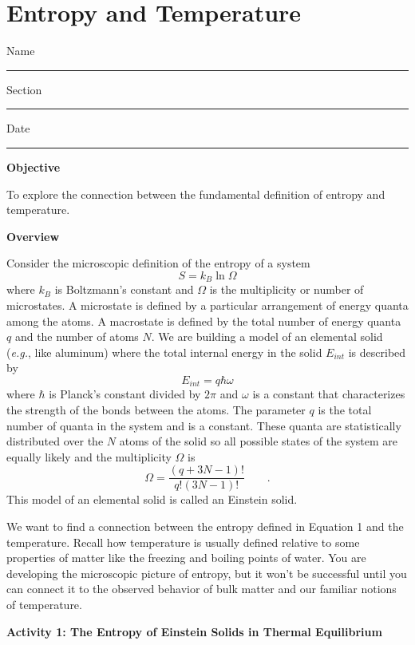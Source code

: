 \setcounter{equation}{0}
\setcounter{figure}{0}

\section{Entropy and Temperature}

Name \rule{2.0in}{0.1pt}\hfill{}Section \rule{1.0in}{0.1pt}\hfill{}Date
\rule{1.0in}{0.1pt}

\textbf{Objective}

To explore the connection between the fundamental definition of entropy and
temperature.

\textbf{Overview}

Consider the microscopic  definition of the entropy of a system
\begin{equation}
S = k_B \ln \Omega
\end{equation}
where $k_B$ is Boltzmann's constant and $\Omega$ is the multiplicity or number of 
microstates.
A microstate is defined by a particular arrangement of energy quanta among the
atoms.
A macrostate is defined by the total number of energy quanta $q$ and the number of atoms $N$.
We are building a model of an elemental solid ({\it e.g.}, like aluminum)
where
the total internal energy in the solid $E_{int}$ is described by
\begin{equation}
E_{int} = q \hbar \omega 
\end{equation}
where $\hbar$ is Planck's constant divided by $2\pi$ and $\omega$ is a constant that
characterizes the strength of the bonds between the atoms.
The parameter 
$q$ is the total number of quanta in the system and is a constant.
These quanta are statistically distributed over the $N$ atoms of the solid so
all possible states of the system are equally likely and the multiplicity $\Omega$
is
\begin{equation}
\Omega = \frac{(q+3N-1)!}{q!(3N-1)!} \qquad .
\end{equation}
This model of an elemental solid is called an Einstein solid.

We want to find a connection between the entropy defined in Equation 1 and the
temperature.
Recall how temperature is usually defined
relative to some properties of matter like the freezing and 
boiling points of water.
You are developing the microscopic picture of entropy, but it won't be successful until
you can connect it to the observed behavior of bulk matter and our familiar notions of 
temperature.

\textbf{Activity 1: The Entropy of Einstein Solids in Thermal Equilibrium}

